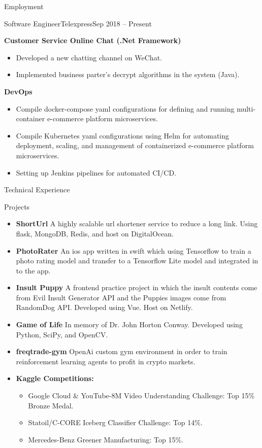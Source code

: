 \documentclass[]{mcdowellcv}
\begin{document}
\begin{cvsection}{Employment}
\begin{cvsubsection}{Software Engineer}{Telexpress}{Sep 2018 -- Present}
\begin{itemize}
			\end{itemize}
			\textbf{Customer Service Online Chat (.Net Framework)}
			\begin{itemize}
				\item Developed a new chatting channel on WeChat.
				\item Implemented business parter's decrypt algorithms in the system (Java).
			\end{itemize}
			\textbf{DevOps}
			\begin{itemize}
				\item Compile docker-compose yaml configurations for defining and running multi-container e-commerce platform microservices.
				\item Compile Kubernetes yaml configurations using Helm for automating deployment, scaling, and management of containerized e-commerce platform microservices.
				\item Setting up Jenkins pipelines for automated CI/CD.
			\end{itemize}
		\end{cvsubsection}
	\end{cvsection}

	\begin{cvsection}{Technical Experience}
		\begin{cvsubsection}{Projects}{}{}
			\begin{itemize}
				\item \textbf{ShortUrl}  A highly scalable url shortener service to reduce a long link. Using flask, MongoDB, Redis, and host on DigitalOcean.
				\item \textbf{PhotoRater}  An ios app written in swift which using Tensorflow to train a photo rating model and transfer to a Tensorflow Lite model and integrated in to the app.
				\item \textbf{Insult Puppy}  A frontend practice project in which the insult contents come from Evil Insult Generator API and the Puppies images come from RandomDog API. Developed using Vue. Host on Netlify.
				\item \textbf{Game of Life}  In memory of Dr. John Horton Conway. Developed using Python, SciPy, and OpenCV.
				\item \textbf{freqtrade-gym}  OpenAi custom gym environment in order to train reinforcement learning agents to profit in crypto markets.
				\item \textbf{Kaggle Competitions:}
					\begin{itemize}
						\item Google Cloud \& YouTube-8M Video Understanding Challenge: Top 15\% Bronze Medal.
						\item Statoil/C-CORE Iceberg Classifier Challenge: Top 14\%.
						\item Mercedes-Benz Greener Manufacturing: Top 15\%.
					\end{itemize}
			\end{itemize}
		\end{cvsubsection}
	\end{cvsection}
	
\end{document}
